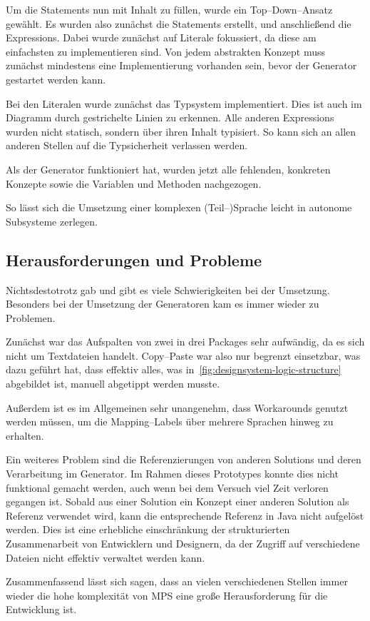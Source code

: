 Um die Statements nun mit Inhalt zu füllen, wurde ein Top--Down--Ansatz gewählt.
Es wurden also zunächst die Statements erstellt, und anschließend die Expressions.
Dabei wurde zunächst auf Literale fokussiert, da diese am einfachsten zu implementieren sind.
Von jedem abstrakten Konzept muss zunächst mindestens eine Implementierung vorhanden sein, bevor der Generator gestartet werden kann.

Bei den Literalen wurde zunächst das Typsystem implementiert.
Dies ist auch im Diagramm durch gestrichelte Linien zu erkennen.
Alle anderen Expressions wurden nicht statisch, sondern über ihren Inhalt typisiert.
So kann sich an allen anderen Stellen auf die Typsicherheit verlassen werden.

Als der Generator funktioniert hat, wurden jetzt alle fehlenden, konkreten Konzepte sowie die Variablen und Methoden nachgezogen.

So lässt sich die Umsetzung einer komplexen (Teil--)Sprache leicht in autonome Subsysteme zerlegen.

\subsection{Herausforderungen und Probleme}\label{subsec:herausforderungen-und-probleme}
Nichtsdestotrotz gab und gibt es viele Schwierigkeiten bei der Umsetzung.
Besonders bei der Umsetzung der Generatoren kam es immer wieder zu Problemen.

Zunächst war das Aufspalten von zwei in drei Packages sehr aufwändig, da es sich nicht um Textdateien handelt.
Copy--Paste war also nur begrenzt einsetzbar, was dazu geführt hat, dass effektiv alles, was in~\autoref{fig:designsystem-logic-structure} abgebildet ist, manuell abgetippt werden musste.

Außerdem ist es im Allgemeinen sehr unangenehm, dass Workarounds genutzt werden müssen, um die Mapping--Labels über mehrere Sprachen hinweg zu erhalten.

Ein weiteres Problem sind die Referenzierungen von anderen Solutions und deren Verarbeitung im Generator.
Im Rahmen dieses Prototypes konnte dies nicht funktional gemacht werden, auch wenn bei dem Versuch viel Zeit verloren gegangen ist.
Sobald aus einer Solution ein Konzept einer anderen Solution als Referenz verwendet wird, kann die entsprechende Referenz in Java nicht aufgelöst werden.
Dies ist eine erhebliche einschränkung der strukturierten Zusammenarbeit von Entwicklern und Designern, da der Zugriff auf verschiedene Dateien nicht effektiv verwaltet werden kann.

Zusammenfassend lässt sich sagen, dass an vielen verschiedenen Stellen immer wieder die hohe komplexität von \ac{MPS} eine große Herausforderung für die Entwicklung ist.
